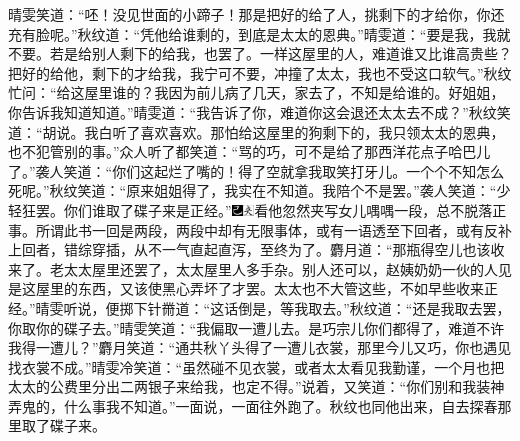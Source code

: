 晴雯笑道：``呸！没见世面的小蹄子！那是把好的给了人，挑剩下的才给你，你还充有脸呢。''秋纹道：``凭他给谁剩的，到底是太太的恩典。''晴雯道：``要是我，我就不要。若是给别人剩下的给我，也罢了。一样这屋里的人，难道谁又比谁高贵些？把好的给他，剩下的才给我，我宁可不要，冲撞了太太，我也不受这口软气。''秋纹忙问：``给这屋里谁的？我因为前儿病了几天，家去了，不知是给谁的。好姐姐，你告诉我知道知道。''晴雯道：``我告诉了你，难道你这会退还太太去不成？''秋纹笑道：``胡说。我白听了喜欢喜欢。那怕给这屋里的狗剩下的，我只领太太的恩典，也不犯管别的事。''众人听了都笑道：``骂的巧，可不是给了那西洋花点子哈巴儿了。''袭人笑道：``你们这起烂了嘴的！得了空就拿我取笑打牙儿。一个个不知怎么死呢。''秋纹笑道：``原来姐姐得了，我实在不知道。我陪个不是罢。''袭人笑道：``少轻狂罢。你们谁取了碟子来是正经。''{\includegraphics[width=3mm]{../Images/00003}\includegraphics[width=3mm]{../Images/00012}\footnotesize \kaishu 看他忽然夹写女儿喁喁一段，总不脱落正事。所谓此书一回是两段，两段中却有无限事体，或有一语透至下回者，或有反补上回者，错综穿插，从不一气直起直泻，至终为了。}麝月道：``那瓶得空儿也该收来了。老太太屋里还罢了，太太屋里人多手杂。别人还可以，赵姨奶奶一伙的人见是这屋里的东西，又该使黑心弄坏了才罢。太太也不大管这些，不如早些收来正经。''晴雯听说，便掷下针黹道：``这话倒是，等我取去。''秋纹道：``还是我取去罢，你取你的碟子去。''晴雯笑道：``我偏取一遭儿去。是巧宗儿你们都得了，难道不许我得一遭儿？''麝月笑道：``通共秋丫头得了一遭儿衣裳，那里今儿又巧，你也遇见找衣裳不成。''晴雯冷笑道：``虽然碰不见衣裳，或者太太看见我勤谨，一个月也把太太的公费里分出二两银子来给我，也定不得。''说着，又笑道：``你们别和我装神弄鬼的，什么事我不知道。''一面说，一面往外跑了。秋纹也同他出来，自去探春那里取了碟子来。

